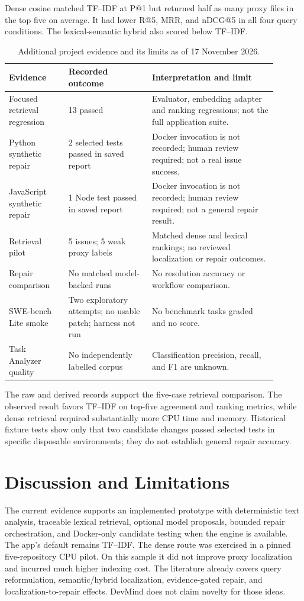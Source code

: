 \documentclass[3p,times,procedia]{elsarticle}
\begin{document}
Dense cosine matched TF--IDF at P@1 but returned half as many proxy files in the top five on average. It had lower R@5, MRR, and nDCG@5 in all four query conditions. The lexical-semantic hybrid also scored below TF--IDF.

\begin{table}[t]
\caption{Additional project evidence and its limits as of 17 November 2026.}
\label{tab:evidence}
\centering
\small
\begin{tabular}{p{0.20\linewidth}p{0.28\linewidth}p{0.42\linewidth}}
\toprule
Evidence & Recorded outcome & Interpretation and limit \\
\midrule
Focused retrieval regression & 13 passed & Evaluator, embedding adapter and ranking regressions; not the full application suite. \\
Python synthetic repair & 2 selected tests passed in saved report & Docker invocation is not recorded; human review required; not a real issue success. \\
JavaScript synthetic repair & 1 Node test passed in saved report & Docker invocation is not recorded; human review required; not a general repair result. \\
Retrieval pilot & 5 issues; 5 weak proxy labels & Matched dense and lexical rankings; no reviewed localization or repair outcomes. \\
Repair comparison & No matched model-backed runs & No resolution accuracy or workflow comparison. \\
SWE-bench Lite smoke & Two exploratory attempts; no usable patch; harness not run & No benchmark tasks graded and no score. \\
Task Analyzer quality & No independently labelled corpus & Classification precision, recall, and F1 are unknown. \\
\bottomrule
\end{tabular}
\end{table}

The raw and derived records support the five-case retrieval comparison. The observed result favors TF--IDF on top-five agreement and ranking metrics, while dense retrieval required substantially more CPU time and memory. Historical fixture tests show only that two candidate changes passed selected tests in specific disposable environments; they do not establish general repair accuracy.

\section{Discussion and Limitations}
The current evidence supports an implemented prototype with deterministic text analysis, traceable lexical retrieval, optional model proposals, bounded repair orchestration, and Docker-only candidate testing when the engine is available. The app's default remains TF--IDF. The dense route was exercised in a pinned five-repository CPU pilot. On this sample it did not improve proxy localization and incurred much higher indexing cost. The literature already covers query reformulation, semantic/hybrid localization, evidence-gated repair, and localization-to-repair effects. DevMind does not claim novelty for those ideas.
\end{document}
